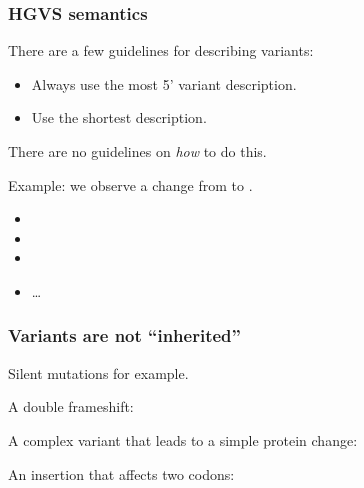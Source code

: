 \documentclass[slidestop]{beamer}
\begin{document}
\begin{frame}
  \frametitle{HGVS semantics}

  There are a few guidelines for describing variants:
  \begin{itemize}
    \item Always use the most 5' variant description.
    \item Use the shortest description.
  \end{itemize}
  \bigskip
  \pause

  There are no guidelines on \emph{how} to do this.
  \bigskip

  Example: we observe a change from  to .
  \begin{itemize}
    \item {}
    \item {}
    \item {}
    \item \ldots
  \end{itemize}
\end{frame}

\begin{frame}
  \frametitle{Variants are not ``inherited''}

  Silent mutations for example.
  \bigskip
  \pause

  A double frameshift:


  \bigskip
  \pause

  A complex variant that leads to a simple protein change:


  \bigskip
  \pause

  An insertion that affects two codons:


\end{frame}
\end{document}
